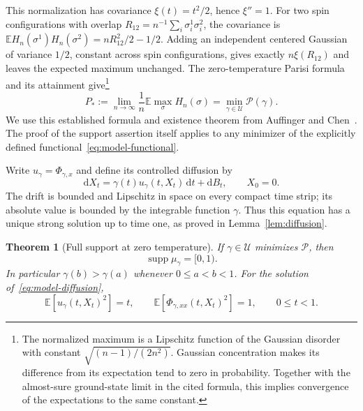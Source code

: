 \documentclass[11pt]{article}
\newcommand{\E}{\mathbb E}
\newcommand{\dd}{\mathrm d}
\DeclareMathOperator{\supp}{supp}
\newtheorem{theorem}{Theorem}[section]
\theoremstyle{remark}
\numberwithin{equation}{section}
\begin{document}
This normalization has covariance $\xi(t)=t^2/2$, hence $\xi''=1$.
For two spin configurations with overlap
$R_{12}=n^{-1}\sum_i\sigma_i^1\sigma_i^2$, the covariance is
$\E H_n(\sigma^1)H_n(\sigma^2)=nR_{12}^2/2-1/2$.
Adding an independent centered Gaussian of variance $1/2$, constant
across spin configurations, gives exactly $n\xi(R_{12})$ and leaves
the expected maximum unchanged. The zero-temperature Parisi formula
and its attainment give\footnote{The normalized maximum is a Lipschitz
function of the Gaussian disorder with constant
$\sqrt{(n-1)/(2n^2)}$. Gaussian concentration makes its difference
from its expectation tend to zero in probability. Together with the
almost-sure ground-state limit in the cited formula, this implies
convergence of the expectations to the same constant.}
\begin{equation}\label{eq:model-ground-state}
 P_*:=\lim_{n\to\infty}\frac1n\E\max_\sigma H_n(\sigma)
     =\min_{\gamma\in\mathcal U}\mathcal P(\gamma).
\end{equation}
We use this established formula and existence theorem from
Auffinger and Chen~\cite[Theorem~1 and the proof of Lemma~3]{AC2017}.
The proof of the support assertion itself applies to any minimizer of
the explicitly defined functional~\eqref{eq:model-functional}.

Write $u_\gamma=\Phi_{\gamma,x}$ and define its controlled diffusion by
\begin{equation}\label{eq:model-diffusion}
 \dd X_t=\gamma(t)u_\gamma(t,X_t)\,\dd t+\dd B_t,
 \qquad X_0=0.
\end{equation}
The drift is bounded and Lipschitz in space on every compact time strip;
its absolute value is bounded by the integrable function $\gamma$.
Thus this equation has a unique strong solution up to time one, as proved
in Lemma~\ref{lem:diffusion}.

\begin{theorem}[Full support at zero temperature]\label{thm:full-support}
If $\gamma\in\mathcal U$ minimizes $\mathcal P$, then
\[
 \supp\mu_\gamma=[0,1).
\]
In particular $\gamma(b)>\gamma(a)$ whenever $0\leq a<b<1$.
For the solution of~\eqref{eq:model-diffusion},
\begin{equation}\label{eq:main-consistency}
 \E[u_\gamma(t,X_t)^2]=t,\qquad
 \E[\Phi_{\gamma,xx}(t,X_t)^2]=1,
 \qquad 0\leq t<1.
\end{equation}
\end{theorem}
\end{document}
